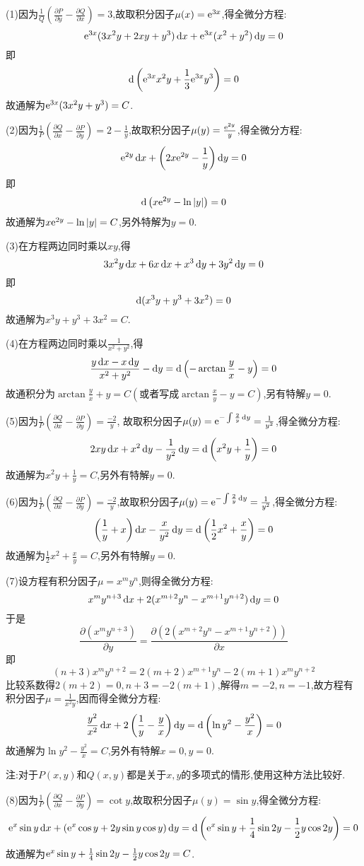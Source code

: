\begin{solve}
(1)因为$\frac{1}{Q}\left(\frac{\partial P}{\partial y}-\frac{\partial Q}{\partial x}\right)=3$,故取积分因子$\mu(x)=\mathrm{e}^{3x}$,得全微分方程:
\[\mathrm{e}^{3x}(3x^2y+2xy+y^3)\mathop{}\!\mathrm{d} x+\mathrm{e}^{3x}(x^2+y^2)\mathop{}\!\mathrm{d} y=0\]
即\[\mathop{}\!\mathrm{d}\left(\mathrm{e}^{3x}x^2y+\frac{1}{3}\mathrm{e}^{3x}y^3\right)=0\]
故通解为$\mathrm{e}^{3x}(3x^2y+y^3)=C$.

(2)因为$\frac{1}{P}\left(\frac{\partial Q}{\partial x}-\frac{\partial P}{\partial y}\right)=2-\frac{1}{y}$,故取积分因子$\mu(y)=\frac{\mathrm{e}^{2y}}{y}$,得全微分方程:
\[\mathrm{e}^{2y}\mathop{}\!\mathrm{d} x+\left(2x\mathrm{e}^{2y}-\frac{1}{y}\right)\mathop{}\!\mathrm{d} y=0\]
即\[\mathop{}\!\mathrm{d}\left(x\mathrm{e}^{2y}-\ln|y|\right)=0\]
故通解为$x\mathrm{e}^{2y}-\ln|y|=C$,另外特解为$y=0$.

(3)在方程两边同时乘以$xy$,得
\[3x^2y\mathop{}\!\mathrm{d} x+6x\mathop{}\!\mathrm{d} x+x^3\mathop{}\!\mathrm{d} y+3y^2\mathop{}\!\mathrm{d} y=0\]
即\[\mathop{}\!\mathrm{d}(x^3y+y^3+3x^2)=0\]
故通解为$x^3y+y^3+3x^2=C$.

(4)在方程两边同时乘以$\frac{1}{x^2+y^2}$,得
\[\frac{y\mathop{}\!\mathrm{d} x-x\mathop{}\!\mathrm{d} y}{x^2+y^2}-\mathop{}\!\mathrm{d} y=\mathop{}\!\mathrm{d}\left(-\arctan\frac{y}{x}-y\right)=0\]
故通积分为$\arctan\frac{y}{x}+y=C(\mbox{或者写成}\arctan\frac{x}{y}-y=C)$,另有特解$y=0$.

(5)因为$\frac{1}{P}\left(\frac{\partial Q}{\partial x}-\frac{\partial P}{\partial y}\right)=\frac{-2}{y}$,
故取积分因子$\mu(y)=\mathrm{e}^{-\int\frac{2}{y}\mathop{}\!\mathrm{d} y}=\frac{1}{y^2}$,得全微分方程:
\[2xy\mathop{}\!\mathrm{d} x+x^2\mathop{}\!\mathrm{d} y-\frac{1}{y^2}\mathop{}\!\mathrm{d} y=\mathop{}\!\mathrm{d}\left(x^2y+\frac{1}{y}\right)=0\]
故通解为$x^2y+\frac{1}{y}=C$,另外有特解$y=0$.

(6)因为$\frac{1}{P}\left(\frac{\partial Q}{\partial x}-\frac{\partial P}{\partial y}\right)=\frac{-2}{y}$,故取积分因子$\mu(y)=\mathrm{e}^{-\int\frac{2}{y}\mathop{}\!\mathrm{d} y}=\frac{1}{y^2}$,得全微分方程:
\[\left(\frac{1}{y}+x\right)\mathop{}\!\mathrm{d} x-\frac{x}{y^2}\mathop{}\!\mathrm{d} y=\mathop{}\!\mathrm{d}\left(\frac{1}{2}x^2+\frac{x}{y}\right)=0\]
故通解为$\frac{1}{2}x^2+\frac{x}{y}=C$,另外有特解$y=0$.

(7)设方程有积分因子$\mu=x^my^n$,则得全微分方程:
\[x^my^{n+3}\mathop{}\!\mathrm{d} x+2(x^{m+2}y^n-x^{m+1}y^{n+2})\mathop{}\!\mathrm{d} y=0\]
于是
\[\frac{\partial\left(x^my^{n+3}\right)}{\partial y}=\frac{\partial\left(2\left(x^{m+2}y^n-x^{m+1}y^{n+2}\right)\right)}{\partial x}\]
即
\[(n+3)x^my^{n+2}=2(m+2)x^{m+1}y^n-2(m+1)x^my^{n+2}\]
比较系数得$2(m+2)=0,n+3=-2(m+1)$,解得$m=-2,n=-1$,故方程有积分因子$\mu=\frac{1}{x^2y}$,因而得全微分方程:
\[\frac{y^2}{x^2}\mathop{}\!\mathrm{d} x+2\left(\frac{1}{y}-\frac{y}{x}\right)\mathop{}\!\mathrm{d} y=\mathop{}\!\mathrm{d}\left(\ln y^2-\frac{y^2}{x}\right)=0\]
故通解为$\ln y^2-\frac{y^2}{x}=C$,另外有特解$x=0,y=0$.

注:对于$P(x,y)$和$Q(x,y)$都是关于$x,y$的多项式的情形,使用这种方法比较好.

(8)因为$\frac{1}{P}\left(\frac{\partial Q}{\partial x}-\frac{\partial P}{\partial y}\right)=\cot y$,故取积分因子$\mu(y)=\sin y$,得全微分方程:
\[\mathrm{e}^x\sin y\mathop{}\!\mathrm{d} x+\left(\mathrm{e}^x\cos y+2y\sin y\cos y\right)\mathop{}\!\mathrm{d} y=\mathop{}\!\mathrm{d}\left(\mathrm{e}^x\sin y+\frac{1}{4}\sin2y-\frac{1}{2}y\cos2y\right)=0\]
故通解为$\mathrm{e}^x\sin y+\frac{1}{4}\sin2y-\frac{1}{2}y\cos2y=C$.
\end{solve}

